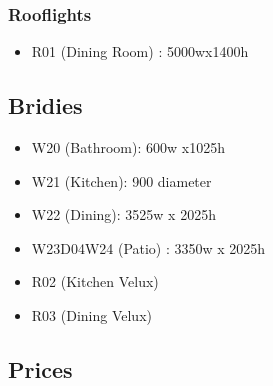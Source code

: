 \subsubsection{Rooflights}
\begin{itemize}
\item R01 (Dining Room) : 5000wx1400h
\end{itemize}    

\subsection {Bridies}
\begin{itemize}
\item W20 (Bathroom): 600w x1025h
\item W21 (Kitchen): 900 diameter
\item W22 (Dining): 3525w x 2025h
\item W23D04W24 (Patio) : 3350w x 2025h
\item R02 (Kitchen Velux)
\item R03 (Dining Velux)
\end{itemize}

\subsection{Prices}

